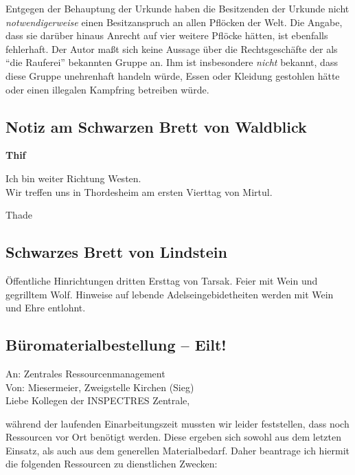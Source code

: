 Entgegen der Behauptung der Urkunde haben die Besitzenden der Urkunde nicht \textit{notwendigerweise} einen Besitzanspruch an allen Pflöcken der Welt.
Die Angabe, dass sie darüber hinaus Anrecht auf vier weitere Pflöcke hätten, ist ebenfalls fehlerhaft.
Der Autor maßt sich keine Aussage über die Rechtsgeschäfte der als \enquote{die Rauferei} bekannten Gruppe an.
Ihm ist insbesondere \textit{nicht} bekannt, dass diese Gruppe unehrenhaft handeln würde, Essen oder Kleidung gestohlen hätte oder einen illegalen Kampfring betreiben würde.


\subsection{Notiz am Schwarzen Brett von Waldblick}
\begin{center}
    \textbf{Thif}
\end{center}
\vspace{-1.5em}
\noindent
Ich bin weiter Richtung Westen. \\
Wir treffen uns in Thordesheim am ersten Vierttag von Mirtul.

Thade


\DeclareRobustCommand{\sxout}[1]{\texorpdfstring{\xout{#1}}{#1}}
\subsection{Schwarzes Brett von  Lindstein}
Öffentliche Hinrichtungen dritten Ersttag von Tarsak. Feier mit Wein und gegrilltem Wolf.
Hinweise auf lebende Adelseingebidetheiten werden mit Wein und Ehre entlohnt.


\subsection{Büromaterialbestellung -- Eilt!}
An: Zentrales Ressourcenmanagement \\
Von: Miesermeier, Zweigstelle Kirchen (Sieg) \\

\noindent
Liebe Kollegen der INSPECTRES Zentrale,

während der laufenden Einarbeitungszeit mussten wir leider feststellen, dass noch Ressourcen vor Ort benötigt werden.
Diese ergeben sich sowohl aus dem letzten Einsatz, als auch aus dem generellen Materialbedarf.
Daher beantrage ich hiermit die folgenden Ressourcen zu dienstlichen Zwecken:

